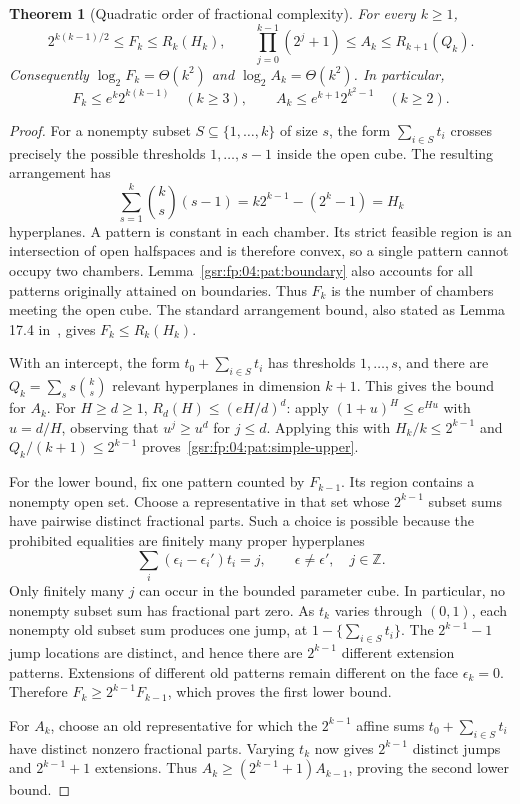 \documentclass[11pt,letterpaper]{article}
\numberwithin{equation}{section}
\newtheorem{theorem}{Theorem}[section]
\theoremstyle{definition}
\theoremstyle{remark}
\newcommand{\1}{\mathbf 1}
\begin{document}
\begin{theorem}[Quadratic order of fractional complexity]\label{gsr:fp:04:pat:bounds}
For every $k\ge1$,
\begin{equation}\label{gsr:fp:04:pat:two-sided}
 2^{k(k-1)/2}\le F_k\le R_k(H_k),
 \qquad
 \prod_{j=0}^{k-1}(2^j+1)\le A_k\le R_{k+1}(Q_k).
\end{equation}
Consequently $\log_2 F_k=\Theta(k^2)$ and
$\log_2 A_k=\Theta(k^2)$. In particular,
\begin{equation}\label{gsr:fp:04:pat:simple-upper}
 F_k\le e^k2^{k(k-1)}\quad(k\ge3),
 \qquad
 A_k\le e^{k+1}2^{k^2-1}\quad(k\ge2).
\end{equation}
\end{theorem}
\begin{proof}
For a nonempty subset $S\subseteq\{1,\ldots,k\}$ of size $s$, the form
$\sum_{i\in S}t_i$ crosses precisely the possible thresholds
$1,\ldots,s-1$ inside the open cube. The resulting arrangement has
\[
 \sum_{s=1}^k\binom ks(s-1)
   =k2^{k-1}-(2^k-1)=H_k
\]
hyperplanes. A pattern is constant in each chamber. Its strict feasible
region is an intersection of open halfspaces and is therefore convex,
so a single pattern cannot occupy two chambers. Lemma~\ref{gsr:fp:04:pat:boundary}
also accounts for all patterns originally attained on boundaries.
Thus $F_k$ is the number of chambers meeting the open cube. The standard
arrangement bound, also stated as Lemma 17.4 in~\cite{gowers}, gives
$F_k\le R_k(H_k)$.

With an intercept, the form $t_0+\sum_{i\in S}t_i$ has thresholds
$1,\ldots,s$, and there are $Q_k=\sum_s s\binom ks$ relevant
hyperplanes in dimension $k+1$. This gives the bound for $A_k$.
For $H\ge d\ge1$, $R_d(H)\le(eH/d)^d$: apply
$(1+u)^H\le e^{Hu}$ with $u=d/H$, observing that
$u^j\ge u^d$ for $j\le d$. Applying this with $H_k/k\le2^{k-1}$
and $Q_k/(k+1)\le2^{k-1}$ proves~\eqref{gsr:fp:04:pat:simple-upper}.

For the lower bound, fix one pattern counted by $F_{k-1}$. Its region
contains a nonempty open set. Choose a representative in that set whose
$2^{k-1}$ subset sums have pairwise distinct fractional parts. Such a
choice is possible because the prohibited equalities are finitely many
proper hyperplanes
\[
 \sum_i(\epsilon_i-\epsilon_i')t_i=j,
 \qquad \epsilon\ne\epsilon',\quad j\in\mathbb Z.
\]
Only finitely many $j$ can occur in the bounded parameter cube.
In particular, no nonempty subset sum has fractional part zero.
As $t_k$ varies through $(0,1)$, each nonempty old subset sum produces
one jump, at $1-\{\sum_{i\in S}t_i\}$. The $2^{k-1}-1$ jump locations
are distinct, and hence there are $2^{k-1}$ different extension patterns.
Extensions of different old patterns remain different on the face
$\epsilon_k=0$. Therefore
$F_k\ge2^{k-1}F_{k-1}$, which proves the first lower bound.

For $A_k$, choose an old representative for which the $2^{k-1}$ affine
sums $t_0+\sum_{i\in S}t_i$ have distinct nonzero fractional parts.
Varying $t_k$ now gives $2^{k-1}$ distinct jumps and
$2^{k-1}+1$ extensions. Thus
$A_k\ge(2^{k-1}+1)A_{k-1}$, proving the second lower bound.
\end{proof}
\end{document}
